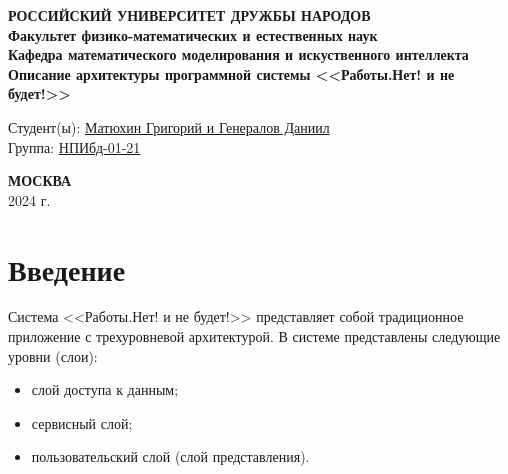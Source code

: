 \documentclass[a4page]{article}
\begin{document}

\begin{titlepage}

\begin{center}
\hfill \break
\textbf{
\large{РОССИЙСКИЙ УНИВЕРСИТЕТ ДРУЖБЫ НАРОДОВ}\\
\normalsize{Факультет физико-математических и естественных наук}\\ 
\normalsize{Кафедра математического моделирования и искуственного интеллекта}\\
}
\vspace*{\fill}
\Large{\textbf{Описание архитектуры программной системы <<Работы.Нет! и не будет!>>}}
\vspace*{\fill}

\end{center}
 
 \begin{flushright}
 Студент(ы): \underline{Матюхин Григорий и Генералов Даниил}\\ \vspace{0.5cm}
 Группа: \underline{НПИбд-01-21}
 \end{flushright}
 
 
\begin{center} \textbf{МОСКВА} \\ 2024 г. \end{center}
\thispagestyle{empty} %

\end{titlepage}

\newpage

\tableofcontents

\newpage

\section{Введение}

Система <<Работы.Нет! и не будет!>> представляет собой
традиционное приложение с трехуровневой архитектурой.
В системе представлены следующие уровни (слои):

\begin{itemize}
  \item слой доступа к данным;
  \item сервисный слой;
  \item пользовательский слой (слой представления).
\end{itemize}
\end{document}
